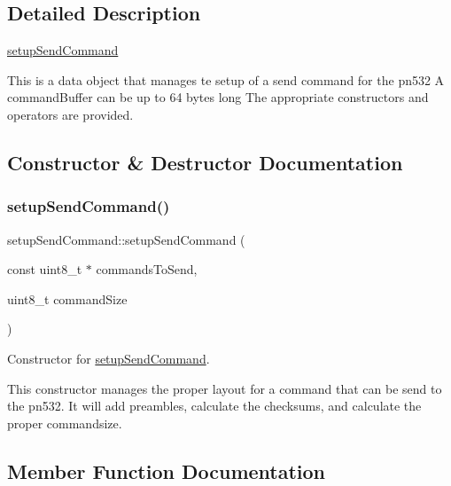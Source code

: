 \subsection{Detailed Description}
\hyperlink{classsetupSendCommand}{setup\+Send\+Command} 

This is a data object that manages te setup of a send command for the pn532 A command\+Buffer can be up to 64 bytes long The appropriate constructors and operators are provided. 

\subsection{Constructor \& Destructor Documentation}
\mbox{\label{classsetupSendCommand_ab61ddb3490a81ce23199f38bf01c5474}} 
\subsubsection{\texorpdfstring{setup\+Send\+Command()}{setupSendCommand()}}
{\footnotesize\ttfamily setup\+Send\+Command\+::setup\+Send\+Command (\begin{DoxyParamCaption}\item[{const uint8\+\_\+t $\ast$}]{commands\+To\+Send,  }\item[{uint8\+\_\+t}]{command\+Size }\end{DoxyParamCaption})}



Constructor for \hyperlink{classsetupSendCommand}{setup\+Send\+Command}. 

This constructor manages the proper layout for a command that can be send to the pn532. It will add preambles, calculate the checksums, and calculate the proper commandsize. 

\subsection{Member Function Documentation}
\mbox{\label{classsetupSendCommand_ac31e42b6848a7cee79b23924759753b9}} 
